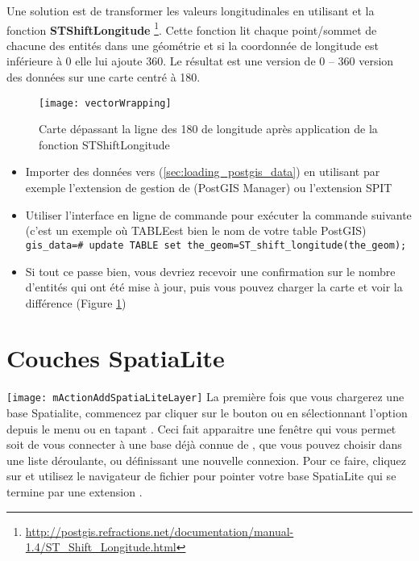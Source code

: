 Une solution est de transformer les valeurs longitudinales en utilisant \pg et la fonction \textbf{ST\textunderscore Shift\textunderscore Longitude}
\footnote{\url{http://postgis.refractions.net/documentation/manual-1.4/ST_Shift_Longitude.html}}. Cette fonction lit chaque point/sommet de chacune des entités dans une géométrie et si la coordonnée de longitude est inférieure à 0\degres{} elle lui ajoute 360\degres{}. Le résultat est une version de 0\degres{} -- 360\degres{} version des données sur une carte centré à 180\degres{}.

\begin{figure}[ht]
   \begin{center}
   
   \texttt{[image: vectorWrapping]}
   \caption{Carte dépassant la ligne des 180\degres{} de longitude après application de la fonction ST\textunderscore Shift\textunderscore Longitude}
\label{fig:vector_wrapping}
\end{center}
\end{figure}


\begin{itemize}[label=--]
\item Importer des données vers \pg (\ref{sec:loading_postgis_data}) en utilisant par exemple l'extension de gestion de \pg (PostGIS Manager) ou l'extension SPIT
\item Utiliser l'interface en ligne de commande \pg pour exécuter la commande suivante (c'est un exemple où \og TABLE\fg est bien le nom de votre table PostGIS) \\ 
\texttt{gis\_data=\# update TABLE set the\_geom=ST\_shift\_longitude(the\_geom);} 
\item Si tout ce passe bien, vous devriez recevoir une confirmation sur le nombre d'entités qui ont été mise à jour, puis vous pouvez charger la carte et voir la différence (Figure \ref{fig:vector_wrapping})
\end{itemize}

\section{Couches SpatiaLite} 
\label{label_spatialite} 

\texttt{[image: mActionAddSpatiaLiteLayer]}
La première fois que vous chargerez une base Spatialite, commencez par cliquer sur le bouton  ou en sélectionnant l'option\\  depuis le menu  ou en tapant . Ceci fait apparaitre une fenêtre qui vous permet soit de vous connecter à une base déjà connue de \qg, que vous pouvez choisir dans une liste déroulante, ou définissant une nouvelle connexion. Pour ce faire, cliquez sur  et utilisez le navigateur de fichier pour pointer votre base SpatiaLite qui se termine par une extension .

